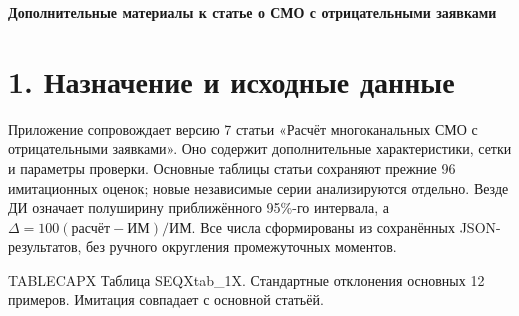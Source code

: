 
\begin{center}\Large\bfseries Дополнительные материалы к статье о СМО с отрицательными заявками\end{center}
\section*{1. Назначение и исходные данные}
Приложение сопровождает версию 7 статьи «Расчёт многоканальных СМО с отрицательными заявками». Оно содержит дополнительные характеристики, сетки и параметры проверки. Основные таблицы статьи сохраняют прежние 96 имитационных оценок; новые независимые серии анализируются отдельно. Везде ДИ означает полуширину приближённого 95\%-го интервала, а \(\Delta=100(\text{расчёт}-\text{ИМ})/\text{ИМ}\). Все числа сформированы из сохранённых JSON-результатов, без ручного округления промежуточных моментов.

\noindent TABLECAPX Таблица SEQXtab_1X. Стандартные отклонения основных 12 примеров. Имитация совпадает с основной статьёй.\par

